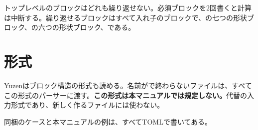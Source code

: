 トップレベルのブロックはどれも繰り返せない。必須ブロックを2回書くと計算は中断する。繰り返せるブロックはすべて入れ子のブロックで、の七つの形状ブロック、の六つの形状ブロック、である。

\section{形式}
\label{sec:inputformat:legacy}

Yuzenはブロック構造の形式も読める。名前がで終わらないファイルは、すべてこの形式のパーサーに渡す。\textbf{この形式は本マニュアルでは規定しない。}代替の入力形式であり、新しく作るファイルには使わない。

同梱のケースと本マニュアルの例は、すべてTOMLで書いてある。
